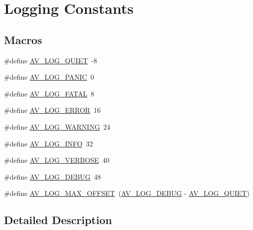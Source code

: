 \hypertarget{group__lavu__log__constants}{}\section{Logging Constants}
\label{group__lavu__log__constants}
\subsection*{Macros}
\begin{DoxyCompactItemize}
\item 
\#define \hyperlink{group__lavu__log__constants_ga11e329935b59b83ca722b66674f37fd4}{A\+V\+\_\+\+L\+O\+G\+\_\+\+Q\+U\+I\+ET}~-\/8
\item 
\#define \hyperlink{group__lavu__log__constants_ga09623098406ba81d130824ac742d146e}{A\+V\+\_\+\+L\+O\+G\+\_\+\+P\+A\+N\+IC}~0
\item 
\#define \hyperlink{group__lavu__log__constants_ga96970a2980bf6ad28cd403e7dc52d6c5}{A\+V\+\_\+\+L\+O\+G\+\_\+\+F\+A\+T\+AL}~8
\item 
\#define \hyperlink{group__lavu__log__constants_gaffe151ff4cd8a24b2e77ac8d9616c85c}{A\+V\+\_\+\+L\+O\+G\+\_\+\+E\+R\+R\+OR}~16
\item 
\#define \hyperlink{group__lavu__log__constants_ga85b57516ca703cc47d9bbe5f4658c716}{A\+V\+\_\+\+L\+O\+G\+\_\+\+W\+A\+R\+N\+I\+NG}~24
\item 
\#define \hyperlink{group__lavu__log__constants_gad172eacfed8653e454c6fdcbe53baab3}{A\+V\+\_\+\+L\+O\+G\+\_\+\+I\+N\+FO}~32
\item 
\#define \hyperlink{group__lavu__log__constants_ga9b58b28e2d429b930b69db19877f76a8}{A\+V\+\_\+\+L\+O\+G\+\_\+\+V\+E\+R\+B\+O\+SE}~40
\item 
\#define \hyperlink{group__lavu__log__constants_ga5b7221c3afd06848486776bd834a58a5}{A\+V\+\_\+\+L\+O\+G\+\_\+\+D\+E\+B\+UG}~48
\item 
\#define \hyperlink{group__lavu__log__constants_gad87b54332d00f280bf5db0fd2f56f340}{A\+V\+\_\+\+L\+O\+G\+\_\+\+M\+A\+X\+\_\+\+O\+F\+F\+S\+ET}~(\hyperlink{group__lavu__log__constants_ga5b7221c3afd06848486776bd834a58a5}{A\+V\+\_\+\+L\+O\+G\+\_\+\+D\+E\+B\+UG} -\/ \hyperlink{group__lavu__log__constants_ga11e329935b59b83ca722b66674f37fd4}{A\+V\+\_\+\+L\+O\+G\+\_\+\+Q\+U\+I\+ET})
\end{DoxyCompactItemize}


\subsection{Detailed Description}



